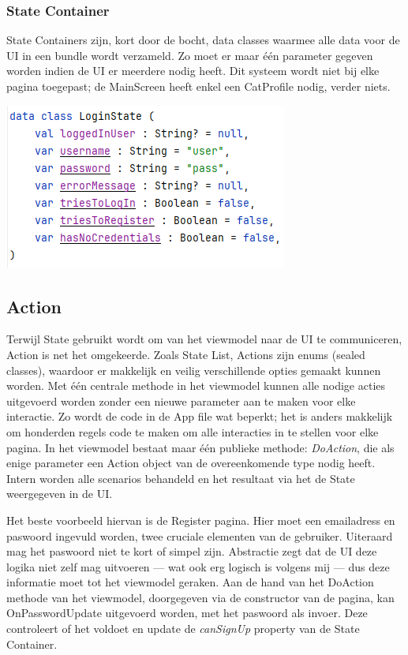 \documentclass{report}
\begin{document}
\subsubsection{State Container}
State Containers zijn, kort door de bocht, data classes waarmee alle data voor de UI in een bundle wordt verzameld.
Zo moet er maar één parameter gegeven worden indien de UI er meerdere nodig heeft.
Dit systeem wordt niet bij elke pagina toegepast; de MainScreen heeft enkel een CatProfile nodig, verder niets.
\begin{center}
    \includegraphics{MVVM_StateContainer}
\end{center}


\subsection{Action}
Terwijl State gebruikt wordt om van het viewmodel naar de UI te communiceren, Action is net het omgekeerde.
Zoals State List, Actions zijn enums (sealed classes), waardoor er makkelijk en veilig verschillende opties gemaakt kunnen worden.
Met één centrale methode in het viewmodel kunnen alle nodige acties uitgevoerd worden zonder een nieuwe parameter aan te maken voor elke interactie.
Zo wordt de code in de App file wat beperkt; het is anders makkelijk om honderden regels code te maken om alle interacties in te stellen voor elke pagina.
In het viewmodel bestaat maar één publieke methode: \textit{DoAction}, die als enige parameter een Action object van de overeenkomende type nodig heeft.
Intern worden alle scenarios behandeld en het resultaat via het de State weergegeven in de UI. 

Het beste voorbeeld hiervan is de Register pagina. Hier moet een emailadress en paswoord ingevuld worden, twee cruciale elementen van de gebruiker.
Uiteraard mag het paswoord niet te kort of simpel zijn.
Abstractie zegt dat de UI deze logika niet zelf mag uitvoeren --- wat ook erg logisch is volgens mij --- dus deze informatie moet tot het viewmodel geraken.
Aan de hand van het DoAction methode van het viewmodel, doorgegeven via de constructor van de pagina, kan OnPasswordUpdate uitgevoerd worden, met het paswoord als invoer.
Deze controleert of het voldoet en update de \textit{canSignUp} property van de State Container.
\end{document}
